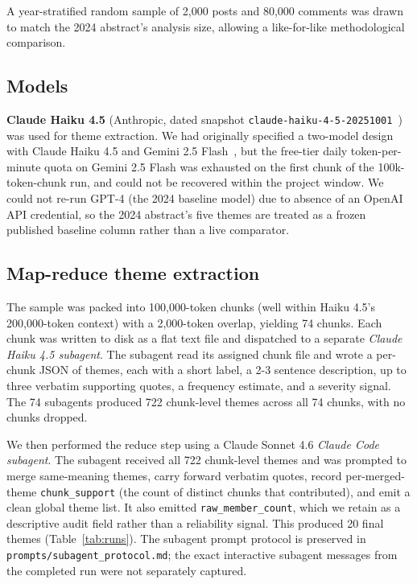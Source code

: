 \documentclass[11pt]{article}
\begin{document}
A year-stratified random sample of 2{,}000 posts and 80{,}000 comments
was drawn to match the 2024 abstract's analysis size, allowing a
like-for-like methodological comparison.



\subsection{Models}

\textbf{Claude Haiku 4.5} (Anthropic, dated snapshot
\texttt{claude-haiku-4-5-20251001}~\cite{anthropic_claude_haiku}) was
used for theme extraction. We had originally specified a two-model
design with Claude Haiku 4.5 and Gemini 2.5 Flash~\cite{google_gemini_2_5},
but the free-tier daily token-per-minute quota on Gemini 2.5 Flash was
exhausted on the first chunk of the 100k-token-chunk run, and could
not be recovered within the project window. We could not re-run GPT-4
(the 2024 baseline model) due to absence of an OpenAI API credential,
so the 2024 abstract's five themes are treated as a frozen published
baseline column rather than a live comparator.

\subsection{Map-reduce theme extraction}

The sample was packed into 100{,}000-token chunks (well within Haiku
4.5's 200{,}000-token context) with a 2{,}000-token overlap, yielding
74 chunks. Each chunk was written to disk as a flat text file and
dispatched to a separate \emph{Claude Haiku 4.5 subagent}. The
subagent read its assigned chunk file and wrote a per-chunk JSON of
themes, each with a short label, a 2-3 sentence description, up to
three verbatim supporting quotes, a frequency estimate, and a
severity signal. The 74 subagents produced 722 chunk-level themes
across all 74 chunks, with no chunks dropped.

We then performed the reduce step using a Claude Sonnet 4.6 \emph{Claude
Code subagent}. The subagent received all 722 chunk-level themes and
was prompted to merge same-meaning themes, carry forward verbatim
quotes, record per-merged-theme \texttt{chunk\_support} (the count of
distinct chunks that contributed), and emit a clean global theme list.
It also emitted \texttt{raw\_member\_count}, which we retain as a
descriptive audit field rather than a reliability signal. This produced
20 final themes (Table~\ref{tab:runs}). The subagent prompt protocol is
preserved in \texttt{prompts/subagent\_protocol.md}; the exact
interactive subagent messages from the completed run were not separately
captured.
\end{document}
